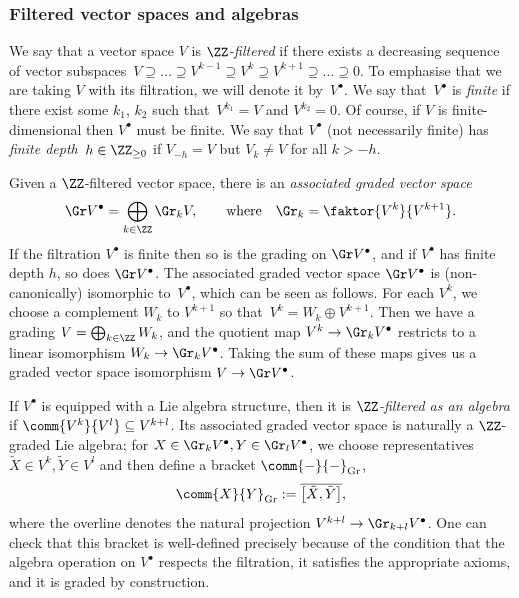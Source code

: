\subsubsection{Filtered vector spaces and algebras}
\label{sec:filtered-alg}

We say that a vector space $V$ is \emph{$\ZZ$-filtered} if there exists a decreasing sequence of vector subspaces~${V \supseteq \dots \supseteq V^{k-1} \supseteq V^k \supseteq V^{k+1} \supseteq \dots \supseteq 0}$.
To emphasise that we are taking $V$ with its filtration, we will denote it by~$V^\bullet$. We say that~$V^\bullet$ is \emph{finite} if there exist some $k_1$, $k_2$ such that~${V^{k_1}=V}$ and $V^{k_2}=0$. Of course, if $V$ is finite-dimensional then $V^\bullet$ must be finite. We say that $V^\bullet$ (not necessarily finite) has \emph{finite depth}~${h\in\ZZ_{\geq 0}}$ if $V_{-h} = V$ but $V_k\neq V$ for all $k>-h$.

Given a $\ZZ$-filtered vector space, there is an \emph{associated graded vector space}
\[
	\Gr V^\bullet = \bigoplus_{k\in\ZZ} \Gr_k V,\qquad \text{where}\quad \Gr_k = \faktor{V^k}{V^{k+1}}.
\]
If the filtration $V^\bullet$ is finite then so is the grading on $\Gr V^\bullet$, and if $V^\bullet$ has finite depth $h$, so does $\Gr V^\bullet$. The associated graded vector space $\Gr V^\bullet$ is (non-canonically) isomorphic to~$V^\bullet$, which can be seen as follows. For each $V^k$, we choose a complement $W_k$ to $V^{k+1}$ so that~${V^k=W_k\oplus V^{k+1}}$. Then we have a grading $V=\bigoplus_{k\in\ZZ} W_k$, and the quotient map $V^k\to\Gr_k V^\bullet$ restricts to a linear isomorphism $W_k\to\Gr_kV^\bullet$. Taking the sum of these maps gives us a graded vector space isomorphism $V\to\Gr V^\bullet $.

If $V^\bullet$ is equipped with a Lie algebra structure, then it is \emph{$\ZZ$-filtered as an algebra} if $\comm{V^k}{V^l}\subseteq V^{k+l}$. Its associated graded vector space is naturally a $\ZZ$-graded Lie algebra; for $X\in \Gr_k V^\bullet, Y\in \Gr_l V^\bullet$, we choose representatives $\tilde{X}\in V^k,\tilde{Y}\in V^l$ and then define a bracket $\comm{-}{-}_{\mathrm{Gr}}$,
\[
	\comm{X}{Y}_{\mathrm{Gr}} := \overline{\big[\tilde{X},\tilde{Y}\big]},
\]
where the overline denotes the natural projection $V^{k+l}\to\Gr_{k+l}V^\bullet$. One can check that this bracket is well-defined precisely because of the condition that the algebra operation on $V^\bullet$ respects the filtration, it satisfies the appropriate axioms, and it is graded by construction.


